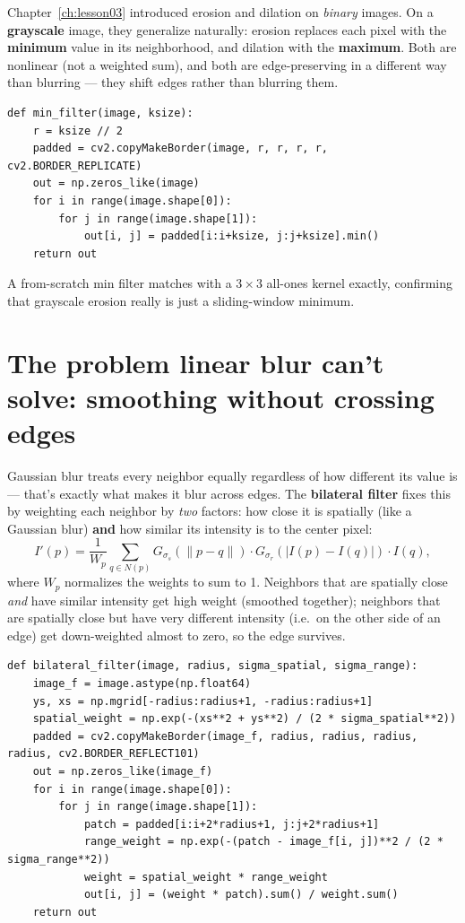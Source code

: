 Chapter~\ref{ch:lesson03} introduced erosion and dilation on \emph{binary} images. On a \textbf{grayscale} image, they generalize naturally: erosion replaces each pixel with the \textbf{minimum} value in its neighborhood, and dilation with the \textbf{maximum}. Both are nonlinear (not a weighted sum), and both are edge-preserving in a different way than blurring --- they shift edges rather than blurring them.

\begin{lstlisting}
def min_filter(image, ksize):
    r = ksize // 2
    padded = cv2.copyMakeBorder(image, r, r, r, r, cv2.BORDER_REPLICATE)
    out = np.zeros_like(image)
    for i in range(image.shape[0]):
        for j in range(image.shape[1]):
            out[i, j] = padded[i:i+ksize, j:j+ksize].min()
    return out
\end{lstlisting}

A from-scratch min filter matches  with a $3\times3$ all-ones kernel exactly, confirming that grayscale erosion really is just a sliding-window minimum.

\section{The problem linear blur can't solve: smoothing without crossing edges}

Gaussian blur treats every neighbor equally regardless of how different its value is --- that's exactly what makes it blur across edges. The \textbf{bilateral filter} fixes this by weighting each neighbor by \emph{two} factors: how close it is spatially (like a Gaussian blur) \textbf{and} how similar its intensity is to the center pixel:
\begin{equation}
I'(p) = \frac{1}{W_p}\sum_{q \in N(p)} G_{\sigma_s}(\|p - q\|) \cdot G_{\sigma_r}(|I(p) - I(q)|) \cdot I(q),
\end{equation}
where $W_p$ normalizes the weights to sum to 1. Neighbors that are spatially close \emph{and} have similar intensity get high weight (smoothed together); neighbors that are spatially close but have very different intensity (i.e.\ on the other side of an edge) get down-weighted almost to zero, so the edge survives.

\begin{lstlisting}
def bilateral_filter(image, radius, sigma_spatial, sigma_range):
    image_f = image.astype(np.float64)
    ys, xs = np.mgrid[-radius:radius+1, -radius:radius+1]
    spatial_weight = np.exp(-(xs**2 + ys**2) / (2 * sigma_spatial**2))
    padded = cv2.copyMakeBorder(image_f, radius, radius, radius, radius, cv2.BORDER_REFLECT101)
    out = np.zeros_like(image_f)
    for i in range(image.shape[0]):
        for j in range(image.shape[1]):
            patch = padded[i:i+2*radius+1, j:j+2*radius+1]
            range_weight = np.exp(-(patch - image_f[i, j])**2 / (2 * sigma_range**2))
            weight = spatial_weight * range_weight
            out[i, j] = (weight * patch).sum() / weight.sum()
    return out
\end{lstlisting}


